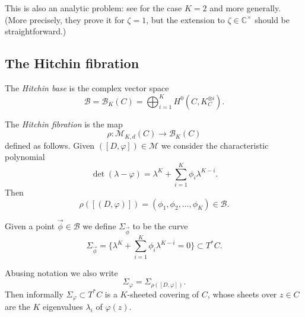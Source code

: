 \documentclass[12pt,letterpaper,reqno]{article}
\numberwithin{equation}{section}
\newcommand{\cB}{\ensuremath{\mathcal B}}
\newcommand{\cM}{\ensuremath{\mathcal M}}
\newcommand{\C}{\ensuremath{\mathbb C}}
\newcommand{\ti}[1]{\textit{#1}}
\newcommand{\fixme}[1]{{\color{orange}{[#1]}}}
\begin{document}
\begin{pf} This is also an analytic problem: see \cite{MR887285} for 
the case $K=2$ and \cite{MR965220} more generally.
(More precisely, they prove it for $\zeta = 1$, but the extension
to $\zeta \in \C^\times$ should be straightforward.)
\end{pf}

\fixme{summarize the situation!}



\subsection{The Hitchin fibration}

\begin{defn} The \ti{Hitchin base} is the
complex vector space
\begin{equation}
  \cB = \cB_K(C) = \bigoplus_{i=1}^K H^0(C, K_C^{\otimes i}).
\end{equation}
\end{defn}

\begin{defn} The \ti{Hitchin fibration} is 
the map
\begin{equation}
  \rho: \cM_{K,d}(C) \to \cB_K(C)
\end{equation}
defined as follows. Given $([D,\varphi]) \in \cM$
we consider the characteristic polynomial
\begin{equation}
  \det (\lambda - \varphi) = \lambda^K + \sum_{i=1}^K \phi_i \lambda^{K-i}.
\end{equation}
Then
\begin{equation}
  \rho([(D,\varphi)]) = (\phi_1, \phi_2, \dots, \phi_K) \in \cB.
\end{equation}
\end{defn}
\begin{defn} Given a point $\vec\phi \in \cB$
we define $\Sigma_{\vec\phi}$ to be the curve
\begin{equation} \label{eq:spectral-curve}
  \Sigma_{\vec\phi} = \{ \lambda^K + \sum_{i=1}^K \phi_i \lambda^{K-i} = 0 \} \subset T^* C.
\end{equation}
\end{defn}

Abusing notation we also write
\begin{equation}
	\Sigma_{\varphi} = \Sigma_{\rho([D,\varphi])}.
\end{equation}
Then informally $\Sigma_\varphi \subset T^* C$ is a $K$-sheeted covering of $C$,
whose sheets over $z \in C$ are the $K$ eigenvalues $\lambda_i$ 
of $\varphi(z)$.
\end{document}
